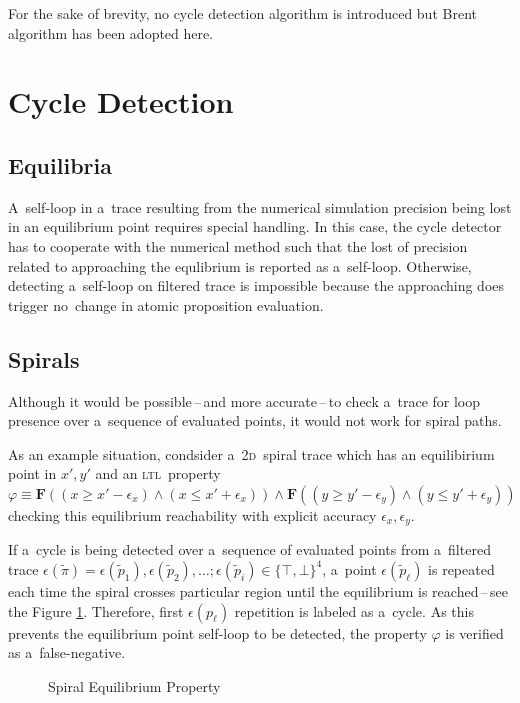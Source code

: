 \documentclass[12pt,twoside,draft]{fithesis}
\newcommand{\ltl}{\textsc{ltl}~}
\newcommand{\bF}{\mathbf{F}}
\begin{document}
For the sake of brevity, no cycle detection algorithm is introduced
but Brent algorithm\cite{wloop,brent} has been adopted here.

\section{Cycle Detection}
\subsection*{Equilibria}
A~self-loop in a~trace resulting from the numerical simulation precision
being lost in an equilibrium point requires special handling. In this
case, the cycle detector has to cooperate with the numerical method such
that the lost of precision related to approaching the equlibrium is
reported as a~self-loop. Otherwise, detecting a~self-loop on filtered
trace is impossible because the approaching does trigger no~change in
atomic proposition evaluation.

\subsection*{Spirals}
Although it would be possible\,--\,and more accurate\,--\,to check
a~trace for loop presence over a~sequence of evaluated points,
it would not work for spiral paths.

As an example situation, condsider
a~\textsc{2d}~spiral trace which has an equilibirium point in $x',y'$
and an \ltl property
$\varphi\equiv\bF((x\ge x'-\epsilon_x)\wedge(x\le x'+\epsilon_x))\wedge
\bF((y\ge y'-\epsilon_y)\wedge(y\le y'+\epsilon_y))$ checking this
equilibrium reachability with explicit accuracy
$\epsilon_x,\epsilon_y$.

If a~cycle is being detected over a~sequence of evaluated points
from a~filtered trace
$\epsilon(\tilde{\pi})=\epsilon(\tilde{p}_1),\epsilon(\tilde{p}_2),
\dotsc; \epsilon(\tilde{p}_i)\in\{\top,\bot\}^4$, a~point
$\epsilon(\tilde{p}_{\ell})$ is repeated each time the spiral crosses
particular region until the equilibrium is reached\,--\,see the Figure
\ref{spiral}. Therefore, first $\epsilon(p_{\ell})$ repetition is
labeled as a~cycle. As this prevents the equilibrium point self-loop to
be detected, the property $\varphi$ is verified as a~false-negative.
\begin{figure}
\center

\caption{Spiral Equilibrium Property}
\label{spiral}
\end{figure}
\end{document}
